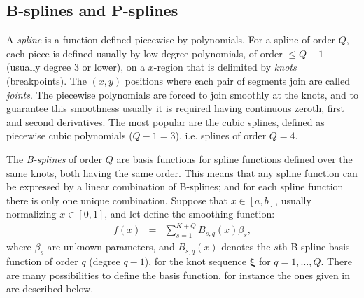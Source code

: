 \documentclass[11pt,letterpaper]{article}
\begin{document}
\subsection{B-splines and P-splines \label{sec:b.p.splines}}

A \textit{spline} is a function defined piecewise by polynomials. For a spline of order $Q$, each piece is defined usually by  low degree polynomials, of order $\leq Q-1$ (usually degree 3 or lower), on a $x$-region that is delimited by \textit{knots} (breakpoints). The $(x,y)$ positions where each pair of segments join are called \textit{joints}. The piecewise polynomials are forced to join smoothly at the knots, and to guarantee this smoothness usually it is required having continuous zeroth, first and second derivatives. The most popular are the cubic splines, defined as  piecewise cubic polynomials ($Q-1=3$), i.e. splines of order $Q=4$.  



The \textit{B-splines} of order $Q$ are basis functions for spline functions defined over the same knots, both having the same order.  
This means that any spline function can be expressed by a linear combination of B-splines;  and for each spline function there is only one unique combination. 
Suppose that $x\in[a,b]$, usually normalizing $x\in[0,1]$, and let define the smoothing function:  
\begin{eqnarray}
f(x) &=& 
\sum_{s=1}^{K+Q} B_{s,q}(x) \beta_{s},   
\label{eq:basis.function}
\end{eqnarray} 
where  $\beta_{s}$ are unknown parameters,  and $B_{s,q}(x)$ denotes the $s$th B-spline basis function of order $q$ (degree $q-1$), for the knot sequence $\boldsymbol{\xi}$ for $q=1,\ldots,Q$.  There are many possibilities to define the basis function, for instance the ones given in \cite{Yee15} are described below. 
\end{document}
